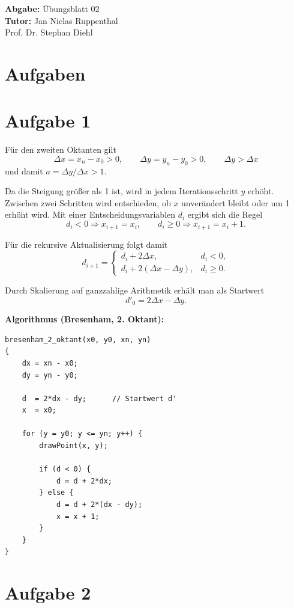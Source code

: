 \documentclass[11pt,a4paper]{article}
\title{\course}
\author{\studentname\\Matrikelnummer: \studentnumber\\\institute}
\date{\today}
\newcommand{\sheetnumber}{02}
\newcommand{\tutor}{Jan Niclas Ruppenthal\\Prof. Dr. Stephan Diehl}
\begin{document}
\maketitle

\begin{center}
    \textbf{Abgabe:} Übungsblatt \sheetnumber \\
    \vspace{4mm}
    \textbf{Tutor:} \tutor
\end{center}

\bigskip

\section*{Aufgaben}

\section{Aufgabe 1}
Für den zweiten Oktanten gilt
\[
\Delta x = x_n-x_0>0,\qquad \Delta y = y_n-y_0>0,\qquad \Delta y>\Delta x
\]
und damit $a=\Delta y/\Delta x>1$.

Da die Steigung größer als 1 ist, wird in jedem Iterationsschritt $y$ erhöht.
Zwischen zwei Schritten wird entschieden, ob $x$ unverändert bleibt oder um 1
erhöht wird. Mit einer Entscheidungsvariablen $d_i$ ergibt sich die Regel
\[
d_i<0 \Rightarrow x_{i+1}=x_i,
\qquad
d_i\ge 0 \Rightarrow x_{i+1}=x_i+1.
\]

Für die rekursive Aktualisierung folgt damit
\[
d_{i+1}=
\begin{cases}
d_i+2\Delta x, & d_i<0,\\
d_i+2(\Delta x-\Delta y), & d_i\ge 0.
\end{cases}
\]

Durch Skalierung auf ganzzahlige Arithmetik erhält man als Startwert
\[
d'_0=2\Delta x-\Delta y.
\]

\textbf{Algorithmus (Bresenham, 2. Oktant):}
\begin{verbatim}
bresenham_2_oktant(x0, y0, xn, yn)
{
    dx = xn - x0;
    dy = yn - y0;

    d  = 2*dx - dy;      // Startwert d'
    x  = x0;

    for (y = y0; y <= yn; y++) {
        drawPoint(x, y);

        if (d < 0) {
            d = d + 2*dx;
        } else {
            d = d + 2*(dx - dy);
            x = x + 1;
        }
    }
}
\end{verbatim}

\section{Aufgabe 2}
\end{document}
